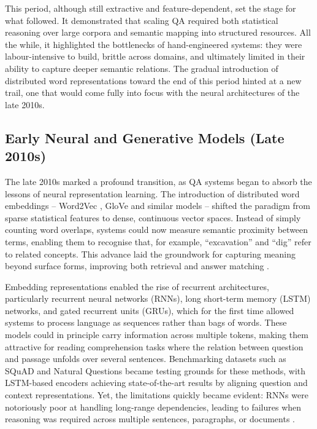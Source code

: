 \begin{spacing}{1.5}
This period, although still extractive and feature-dependent, set the stage for what followed. It demonstrated that scaling QA required both statistical reasoning over large corpora and semantic mapping into structured resources. All the while, it highlighted the bottlenecks of hand-engineered systems: they were labour-intensive to build, brittle across domains, and ultimately limited in their ability to capture deeper semantic relations. The gradual introduction of distributed word representations toward the end of this period hinted at a new trail, one that would come fully into focus with the neural architectures of the late 2010s.

\subsection{Early Neural and Generative Models (Late 2010s)}
The late 2010s marked a profound transition, as QA systems began to absorb the lessons of neural representation learning. The introduction of distributed word embeddings -- Word2Vec \citep{mikolov_efficient_2013}, GloVe \citep{pennington_glove_2014} and similar models -- shifted the paradigm from sparse statistical features to dense, continuous vector spaces. Instead of simply counting word overlaps, systems could now measure semantic proximity between terms, enabling them to recognise that, for example, ``excavation'' and ``dig'' refer to related concepts. This advance laid the groundwork for capturing meaning beyond surface forms, improving both retrieval and answer matching \citep{jurafsky_chapter_2024}.

Embedding representations enabled the rise of recurrent architectures, particularly recurrent neural networks (RNNs), long short-term memory (LSTM) networks, and gated recurrent units (GRUs), which for the first time allowed systems to process language as sequences rather than bags of words. These models could in principle carry information across multiple tokens, making them attractive for reading comprehension tasks where the relation between question and passage unfolds over several sentences. Benchmarking datasets such as SQuAD \citep{rajpurkar_squad_2016} and Natural Questions \citep{kwiatkowski_natural_2019} became testing grounds for these methods, with LSTM-based encoders achieving state-of-the-art results by aligning question and context representations. Yet, the limitations quickly became evident: RNNs were notoriously poor at handling long-range dependencies, leading to failures when reasoning was required across multiple sentences, paragraphs, or documents \citep{jurafsky_chapter_2024}.


\end{spacing}
